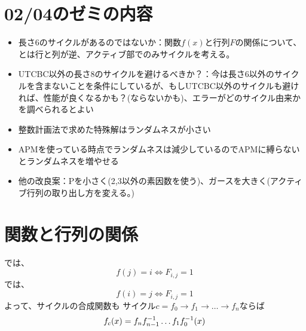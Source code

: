 \documentclass[a4paper,11pt,dvipdfmx]{jsarticle}
\theoremstyle{definition}
\begin{document}
\title{}
\author{}
\date{\today}
\maketitle
\tableofcontents
\clearpage
\section{02/04のゼミの内容}
\begin{itemize}
  \item 長さ6のサイクルがあるのではないか：関数$f(x)$と行列$F$の関係について、\cite{kasai2025quantum}とは行と列が逆、アクティブ部でのみサイクルを考える。
  \item UTCBC以外の長さ8のサイクルを避けるべきか？：今は長さ6以外のサイクルを含まないことを条件にしているが、もしUTCBC以外のサイクルも避ければ、性能が良くなるかも？(ならないかも)、エラーがどのサイクル由来かを調べられるとよい
  \item 整数計画法で求めた特殊解はランダムネスが小さい
  \item APMを使っている時点でランダムネスは減少しているのでAPMに縛らないとランダムネスを増やせる
  \item 他の改良案：Pを小さく(2,3以外の素因数を使う)、ガースを大きく(アクティブ行列の取り出し方を変える。)
\end{itemize}

\section{関数と行列の関係}
\cite{kasai2025quantum}では、
\[
f(j) = i \iff F_{i,j} = 1
\]
\cite{kasai2026breakingorthogonalitybarrierquantum}では、
\[
f(i) = j \iff F_{i,j} = 1
\]
よって、サイクルの合成関数も
サイクル$c=f_0 \rightarrow f_1 \rightarrow\dots\rightarrow f_n$ならば
\[
f_c(x) = f_n f_{n-1}^{-1}\dots f_1 f_{0}^{-1}(x)
\]
\end{document}
